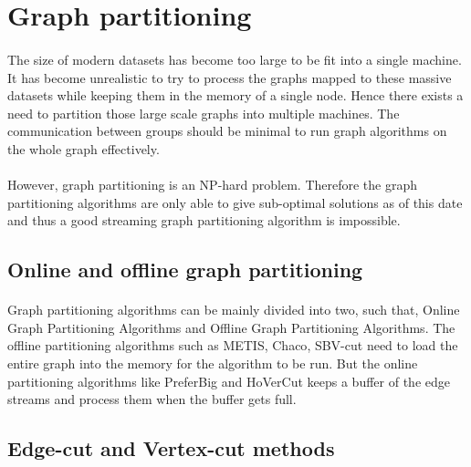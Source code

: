 \section{Graph partitioning}

\paragraph{}
The size of modern datasets has become too large to be fit into a single machine. It has become unrealistic to try to process the graphs mapped to these massive datasets while keeping them in the memory of a single node. Hence there exists a need to partition those large scale graphs into multiple machines. The communication between groups should be minimal to run graph algorithms on the whole graph effectively.

\paragraph{}
However, graph partitioning is an NP-hard problem\cite{noauthor_simplified_nodate}. Therefore the graph partitioning algorithms are only able to give sub-optimal solutions as of this date and thus a good streaming graph partitioning algorithm is impossible\cite{stanton_streaming_2012}.

\subsection{Online and offline graph partitioning}

\paragraph{}
Graph partitioning algorithms can be mainly divided into two, such that, Online Graph Partitioning Algorithms and Offline Graph Partitioning Algorithms. The offline partitioning algorithms such as METIS\cite{karypis_fast_1998}, Chaco\cite{hendrickson_chaco_1993}, SBV-cut\cite{kim_sbv-cut:_2012} need to load the entire graph into the memory for the algorithm to be run. But the online partitioning algorithms like PreferBig\cite{stanton_streaming_2012} and HoVerCut\cite{sajjad_boosting_2016} keeps a buffer of the edge streams and process them when the buffer gets full.

\subsection{Edge-cut and Vertex-cut methods}

